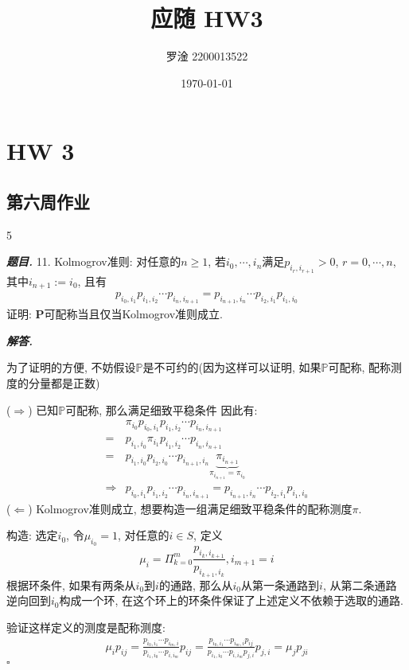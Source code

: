\documentclass[10pt, a4paper, oneside]{ctexart}
\title{\textbf{应随 HW3}}
\author{罗淦 2200013522}
\date{\today}
\newenvironment{problem}{\begin{framed}\par\noindent\textbf{\textit{题目. }}}{\end{framed}\par}
\newenvironment{solution}{%
  \par\noindent\textbf{\textit{解答. }}\ignorespaces
}{%
  \hfill\ensuremath{\square}\par %
}
\begin{document}
\maketitle


\section{HW 3}
\subsection{第六周作业}
5\begin{problem}
        11. Kolmogrov准则: 对任意的$n\geq 1$, 若$i_0,\cdots,i_n$满足$p_{i_r,i_{r+1}}>0$, $r=0,\cdots,n$, 其中$i_{n+1}:=i_0$, 且有
        \begin{align*}
            p_{i_0,i_1}p_{i_1,i_2}\cdots p_{i_n,i_{n+1}}=p_{i_{n+1},i_n}\cdots p_{i_2,i_1}p_{i_1,i_0}
        \end{align*}
        证明: $\mathbf{P}$可配称当且仅当Kolmogrov准则成立.
        \end{problem}
        \begin{solution}
        为了证明的方便, 不妨假设$\mathbb{P}$是不可约的(因为这样可以证明, 如果$\mathbb{P}$可配称, 配称测度的分量都是正数)
        
        ($\Rightarrow$) 已知$\mathbb{P}$可配称, 那么满足细致平稳条件
        因此有:
        \begin{align*}
            &\pi_{i_0}p_{i_0,i_1}p_{i_1,i_2}\cdots p_{i_n,i_{n+1}}\\
            =&p_{i_1,i_0}\pi_{i_1}p_{i_1,i_2}\cdots p_{i_n,i_{n+1}}\\
            =&p_{i_1,i_0}p_{i_2,i_0}\cdots p_{i_{n+1},i_{n}}\underbrace{\pi_{i_{n+1}}}_{\pi_{i_{n+1}}=\pi_{i_0}}\\
            \Rightarrow&p_{i_0,i_1}p_{i_1,i_2}\cdots p_{i_n,i_{n+1}}=p_{i_{n+1},i_n}\cdots p_{i_2,i_1}p_{i_1,i_0}
        \end{align*}
        ($\Leftarrow$) Kolmogrov准则成立, 想要构造一组满足细致平稳条件的配称测度$\pi$.
        
        构造: 选定$i_0$, 令$\mu_{i_0}=1$, 对任意的$i\in S$, 定义
        $$\mu_{i}=\Pi_{k=0}^{m}\frac{p_{i_k,i_{k+1}}}{p_{i_{k+1},i_{k}}}, i_{m+1}=i$$
        根据环条件, 如果有两条从$i_0$到$i$的通路, 那么从$i_0$从第一条通路到$i$, 从第二条通路逆向回到$i_0$构成一个环, 在这个环上的环条件保证了上述定义不依赖于选取的通路.
        
        验证这样定义的测度是配称测度:
        \begin{align*}
            \mu_{i}p_{ij}=\frac{p_{i_0,i_1}\cdots p_{i_{m},i}}{p_{i_1,i_0}\cdots p_{i,i_{m}}}p_{ij}=\frac{p_{i_0,i_1}\cdots p_{i_{m},i}p_{ij}}{p_{i_1,i_0}\cdots p_{i,i_{m}}p_{j,i}}p_{j,i}=\mu_j p_{ji}
        \end{align*}
        \end{solution}
        
\end{document}
